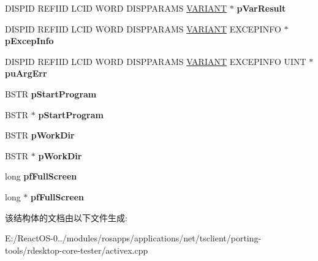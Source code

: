 \begin{DoxyCompactItemize}
\item 
\mbox{\label{struct_m_s_t_s_c_lib_1_1_i_ms_tsc_secured_settings_vtbl_a6251724f86492c9835ff6fcd221ad3a6}} 
D\+I\+S\+P\+ID R\+E\+F\+I\+ID L\+C\+ID W\+O\+RD D\+I\+S\+P\+P\+A\+R\+A\+MS \hyperlink{structtag_v_a_r_i_a_n_t}{V\+A\+R\+I\+A\+NT} $\ast$ {\bfseries p\+Var\+Result}
\item 
\mbox{\label{struct_m_s_t_s_c_lib_1_1_i_ms_tsc_secured_settings_vtbl_a814e5927c006e19cd19f5f1d3a450fd1}} 
D\+I\+S\+P\+ID R\+E\+F\+I\+ID L\+C\+ID W\+O\+RD D\+I\+S\+P\+P\+A\+R\+A\+MS \hyperlink{structtag_v_a_r_i_a_n_t}{V\+A\+R\+I\+A\+NT} E\+X\+C\+E\+P\+I\+N\+FO $\ast$ {\bfseries p\+Excep\+Info}
\item 
\mbox{\label{struct_m_s_t_s_c_lib_1_1_i_ms_tsc_secured_settings_vtbl_a5f617c64863d2344013a3b759f5e8036}} 
D\+I\+S\+P\+ID R\+E\+F\+I\+ID L\+C\+ID W\+O\+RD D\+I\+S\+P\+P\+A\+R\+A\+MS \hyperlink{structtag_v_a_r_i_a_n_t}{V\+A\+R\+I\+A\+NT} E\+X\+C\+E\+P\+I\+N\+FO U\+I\+NT $\ast$ {\bfseries pu\+Arg\+Err}
\item 
\mbox{\label{struct_m_s_t_s_c_lib_1_1_i_ms_tsc_secured_settings_vtbl_a51d019f65c32677a6d9fe8dd74e149ae}} 
B\+S\+TR {\bfseries p\+Start\+Program}
\item 
\mbox{\label{struct_m_s_t_s_c_lib_1_1_i_ms_tsc_secured_settings_vtbl_a98a8cb5a4dabf7ea9f1dcaeaefa33151}} 
B\+S\+TR $\ast$ {\bfseries p\+Start\+Program}
\item 
\mbox{\label{struct_m_s_t_s_c_lib_1_1_i_ms_tsc_secured_settings_vtbl_af9cd7c81656e3156f22abb134a9a65c0}} 
B\+S\+TR {\bfseries p\+Work\+Dir}
\item 
\mbox{\label{struct_m_s_t_s_c_lib_1_1_i_ms_tsc_secured_settings_vtbl_ae01758f3bf5889962f473683d00b3e3c}} 
B\+S\+TR $\ast$ {\bfseries p\+Work\+Dir}
\item 
\mbox{\label{struct_m_s_t_s_c_lib_1_1_i_ms_tsc_secured_settings_vtbl_a1bdf139c739951fb8e1b24f31a887d3a}} 
long {\bfseries pf\+Full\+Screen}
\item 
\mbox{\label{struct_m_s_t_s_c_lib_1_1_i_ms_tsc_secured_settings_vtbl_a61d7b9dd5916a7b2e71367b4049c5065}} 
long $\ast$ {\bfseries pf\+Full\+Screen}
\end{DoxyCompactItemize}


该结构体的文档由以下文件生成\+:\begin{DoxyCompactItemize}
\item 
E\+:/\+React\+O\+S-\/0../modules/rosapps/applications/net/tsclient/porting-\/tools/rdesktop-\/core-\/tester/activex.\+cpp\end{DoxyCompactItemize}
